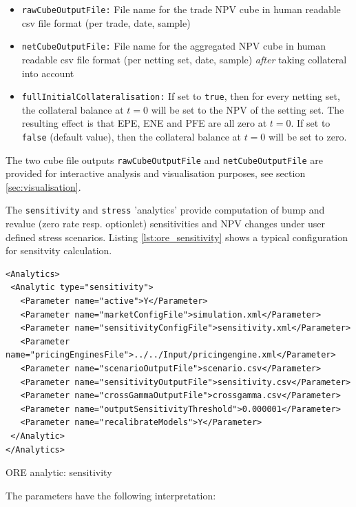 \documentclass[12pt, a4paper]{article}
\begin{document}
\begin{itemize}
\item {\tt rawCubeOutputFile:} File name for the trade NPV cube in human readable csv file format (per trade, date,
sample)
\item {\tt netCubeOutputFile:} File name for the aggregated NPV cube in human readable csv file format (per netting set,
date, sample) {\em after} taking collateral into account
\item {\tt fullInitialCollateralisation:} If set to {\tt true}, then for every netting set, the collateral balance at $t=0$ will be set to the NPV of the setting set. The resulting effect is that EPE, ENE and PFE are all zero at $t=0$. If set to {\tt false} (default value), then the collateral balance at $t=0$ will be set to zero.
\end{itemize}

The two cube file outputs {\tt rawCubeOutputFile} and {\tt netCubeOutputFile} are provided for interactive analysis and visualisation purposes, see section
\ref{sec:visualisation}.

\medskip The {\tt sensitivity} and {\tt stress} 'analytics' provide computation of bump and revalue (zero rate
resp. optionlet) sensitivities and NPV changes under user defined stress scenarios. Listing \ref{lst:ore_sensitivity}
shows a typical configuration for sensitvity calculation.

\begin{listing}[H]
\begin{verbatim}
<Analytics>
 <Analytic type="sensitivity">
   <Parameter name="active">Y</Parameter>
   <Parameter name="marketConfigFile">simulation.xml</Parameter>
   <Parameter name="sensitivityConfigFile">sensitivity.xml</Parameter>
   <Parameter name="pricingEnginesFile">../../Input/pricingengine.xml</Parameter>
   <Parameter name="scenarioOutputFile">scenario.csv</Parameter>
   <Parameter name="sensitivityOutputFile">sensitivity.csv</Parameter>
   <Parameter name="crossGammaOutputFile">crossgamma.csv</Parameter>
   <Parameter name="outputSensitivityThreshold">0.000001</Parameter>
   <Parameter name="recalibrateModels">Y</Parameter>
 </Analytic>
</Analytics>
\end{verbatim}
\caption{ORE analytic: sensitivity}
\label{lst:ore_sensitivity}
\end{listing}

The parameters have the following interpretation:
\end{document}
